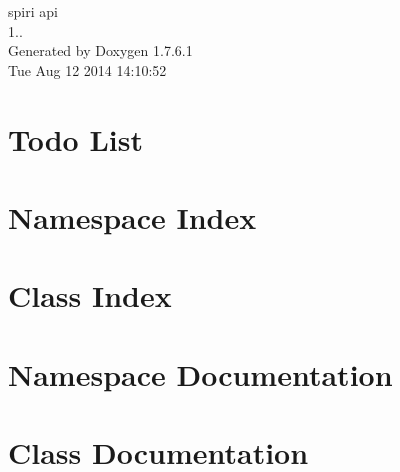 \documentclass[a4paper]{book}
\begin{document}
\hypersetup{pageanchor=false,citecolor=blue}
\begin{titlepage}
\vspace*{7cm}
\begin{center}
{\Large spiri api \\[1ex]\large 1.. }\\
\vspace*{1cm}
{\large \-Generated by Doxygen 1.7.6.1}\\
\vspace*{0.5cm}
{\small Tue Aug 12 2014 14:10:52}\\
\end{center}
\end{titlepage}
\clearemptydoublepage
{}
\tableofcontents
\clearemptydoublepage
{}
\hypersetup{pageanchor=true,citecolor=blue}
\chapter{\-Todo \-List}
\label{todo}
\hypertarget{todo}{}

\chapter{\-Namespace \-Index}

\chapter{\-Class \-Index}

\chapter{\-Namespace \-Documentation}

\chapter{\-Class \-Documentation}





















\printindex
\end{document}
